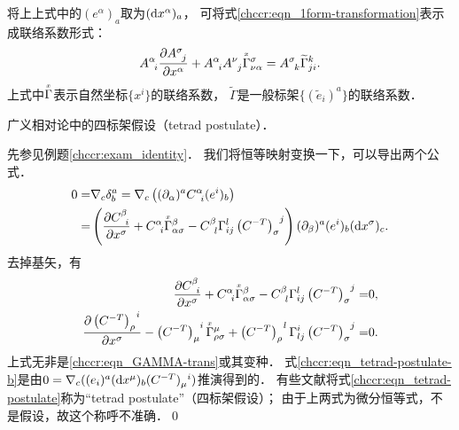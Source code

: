 将上上式中的$(e^\alpha)_{a}$取为$({\rm d}x^\alpha)_a$，
可将式\eqref{chccr:eqn_1form-transformation}表示成联络系数形式：
\begin{equation}\label{chccr:eqn_GAMMA-trans}
    A_{\hphantom{a} i}^{\alpha}\frac{\partial A_{\hphantom{a} j}^{\sigma} }{\partial x^\alpha}  
    + A_{\hphantom{a} i}^{\alpha} A_{\hphantom{a} j}^{\nu}\oversetmy{x}{\Gamma}^{\sigma}_{\nu \alpha} 
    =  A_{\hphantom{a} k}^{\sigma} \widetilde{\Gamma}^{k}_{j i}  .
\end{equation}
上式中$\oversetmy{x}{\Gamma}$表示自然坐标$\{x^i\}$的联络系数，
$\widetilde{\Gamma}$是一般标架$\{(\tilde{e}_i)^a\}$的联络系数．

\begin{example}
	广义相对论中的四标架假设（tetrad postulate）．
\end{example}

先参见例题\ref{chccr:exam_identity}．
我们将恒等映射变换一下，可以导出两个公式．
\begin{align*}
	0 =& \nabla_c \delta^a_b = \nabla_c \left((\partial_\alpha)^a C_{\hphantom{a} i}^{\alpha} (e^i)_b  \right) \\
	=& \left(\frac{\partial C_{\hphantom{a} i}^{\beta} }{\partial x^\sigma}
	+ C_{\hphantom{a} i}^{\alpha} \oversetmy{x}{\Gamma}_{\alpha \sigma}^\beta
	- C_{\hphantom{a} l}^{\beta} \Gamma^l_{ij} \left(C^{-T}\right)^{\hphantom{\alpha}j}_{\sigma} 
	\right) (\partial_\beta)^a (e^i)_b ({\rm d}x^\sigma)_c .
\end{align*}
去掉基矢，有
\begin{subequations}\label{chccr:eqn_tetrad-postulate}
	\begin{align}
		\frac{\partial C_{\hphantom{a} i}^{\beta} }{\partial x^\sigma}
		+ C_{\hphantom{a} i}^{\alpha} \oversetmy{x}{\Gamma}_{\alpha \sigma}^\beta
		- C_{\hphantom{a} l}^{\beta} \Gamma^l_{ij} \left(C^{-T}\right)^{\hphantom{\alpha}j}_{\sigma} = &0,
		\label{chccr:eqn_tetrad-postulate-a} \\
		\frac{\partial \left(C^{-T}\right)^{\hphantom{\alpha}i}_{\rho} }{\partial x^\sigma}
		- \left(C^{-T}\right)^{\hphantom{\alpha}i}_{\mu} \oversetmy{x}{\Gamma}^\mu_{\rho\sigma} 
		+ \left(C^{-T}\right)^{\hphantom{\alpha}l}_{\rho} \Gamma^{i}_{lj} 
		\left(C^{-T}\right)^{\hphantom{\alpha}j}_{\sigma} = & 0. \label{chccr:eqn_tetrad-postulate-b}
	\end{align}
\end{subequations}
上式无非是\eqref{chccr:eqn_GAMMA-trans}或其变种．
式\eqref{chccr:eqn_tetrad-postulate-b}是由$0 = \nabla_c ( (e_i)^a ({\rm d}x^\mu)_b 
(C^{-T})^{\hphantom{\alpha}i}_{\mu} )$推演得到的．
有些文献将式\eqref{chccr:eqn_tetrad-postulate}称为“tetrad postulate”（四标架假设）；
由于上两式为微分恒等式，不是假设，故这个称呼不准确．\qed

